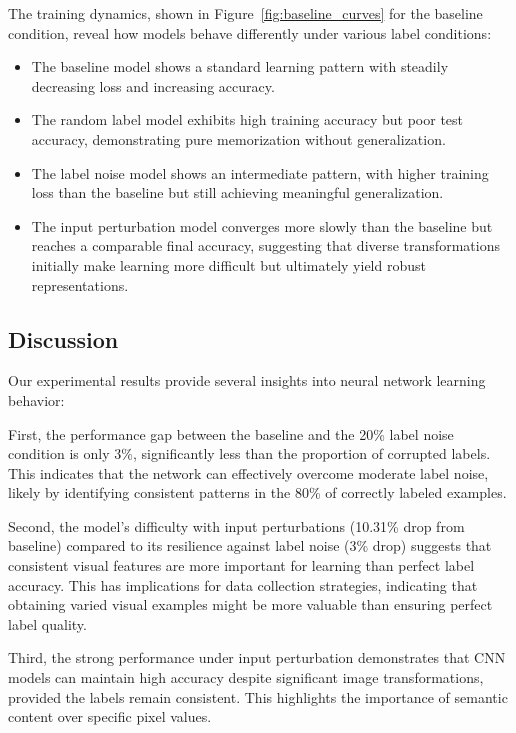 \documentclass[10pt,twocolumn,letterpaper]{article}
\begin{document}
The training dynamics, shown in Figure~\ref{fig:baseline_curves} for the baseline condition, reveal how models behave differently under various label conditions:

\begin{itemize}
    \item The baseline model shows a standard learning pattern with steadily decreasing loss and increasing accuracy.
    \item The random label model exhibits high training accuracy but poor test accuracy, demonstrating pure memorization without generalization.
    \item The label noise model shows an intermediate pattern, with higher training loss than the baseline but still achieving meaningful generalization.
    \item The input perturbation model converges more slowly than the baseline but reaches a comparable final accuracy, suggesting that diverse transformations initially make learning more difficult but ultimately yield robust representations.
\end{itemize}

\subsection{Discussion}

Our experimental results provide several insights into neural network learning behavior:

First, the performance gap between the baseline and the 20\% label noise condition is only 3\%, significantly less than the proportion of corrupted labels.
This indicates that the network can effectively overcome moderate label noise, likely by identifying consistent patterns in the 80\% of correctly labeled examples.

Second, the model's difficulty with input perturbations (10.31\% drop from baseline) compared to its resilience against label noise (3\% drop) suggests that consistent visual features are more important for learning than perfect label accuracy.
This has implications for data collection strategies, indicating that obtaining varied visual examples might be more valuable than ensuring perfect label quality.

Third, the strong performance under input perturbation demonstrates that CNN models can maintain high accuracy despite significant image transformations, provided the labels remain consistent.
This highlights the importance of semantic content over specific pixel values.
\end{document}
